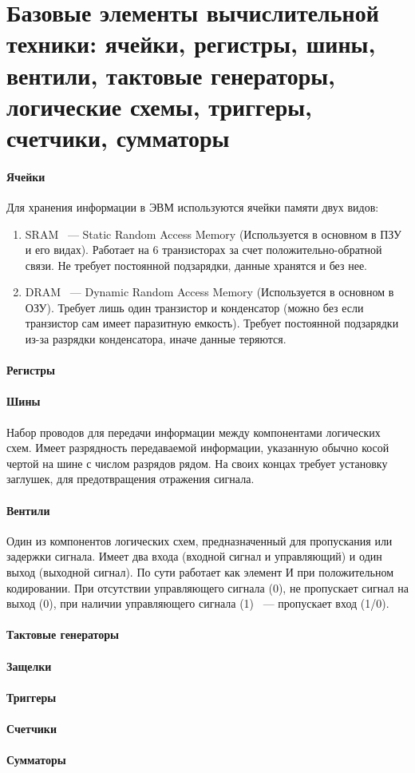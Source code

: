 \documentclass[11pt]{article}
\begin{document}
	\section{Базовые элементы вычислительной техники: ячейки, регистры, шины, вентили, тактовые генераторы, логические схемы, триггеры, счетчики, сумматоры}
	\paragraph{Ячейки}
	Для хранения информации в ЭВМ используются ячейки памяти двух видов:
	\begin{enumerate}
		\item SRAM ~--- Static Random Access Memory (Используется в основном в ПЗУ и его видах). Работает на 6 транзисторах за счет положительно-обратной связи. Не требует постоянной подзарядки, данные хранятся и без нее.
		\item DRAM ~--- Dynamic Random Access Memory (Используется в основном в ОЗУ). Требует лишь один транзистор и конденсатор (можно без если транзистор сам имеет паразитную емкость). Требует постоянной подзарядки из-за разрядки конденсатора, иначе данные теряются.
	\end{enumerate}
	\paragraph{Регистры}
	\paragraph{Шины}
	Набор проводов для передачи информации между компонентами логических схем. Имеет разрядность передаваемой информации, указанную обычно косой чертой на шине с числом разрядов рядом. На своих концах требует установку заглушек, для предотвращения отражения сигнала.
	\paragraph{Вентили}
	Один из компонентов логических схем, предназначенный для пропускания или задержки сигнала. Имеет два входа (входной сигнал и управляющий) и один выход (выходной сигнал). По сути работает как элемент И при положительном кодировании. При отсутствии управляющего сигнала (0), не пропускает сигнал на выход (0), при наличии управляющего сигнала (1) ~--- пропускает вход (1/0).
	\paragraph{Тактовые генераторы}
	\paragraph{Защелки}
	\paragraph{Триггеры}
	\paragraph{Счетчики}
	\paragraph{Сумматоры}
\end{document}

